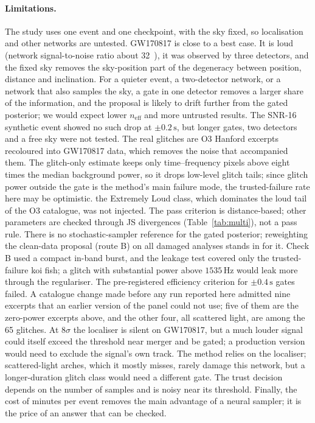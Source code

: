 \documentclass{openjournal}
\newcommand{\neff}{n_{\mathrm{eff}}}
\begin{document}
\paragraph{Limitations.}\label{sec:limits}
The study uses one event and one checkpoint, with the sky fixed, so localisation and other networks are untested.
GW170817 is close to a best case.
It is loud (network signal-to-noise ratio about 32~\cite{Abbott2017gw170817}), it was observed by three detectors, and the fixed sky removes the sky-position part of the degeneracy between position, distance and inclination.
For a quieter event, a two-detector network, or a network that also samples the sky, a gate in one detector removes a larger share of the information, and the proposal is likely to drift further from the gated posterior; we would expect lower $\neff$ and more untrusted results. The SNR-16 synthetic event showed no such drop at $\pm0.2\,\mathrm{s}$, but longer gates, two detectors and a free sky were not tested.
The real glitches are O3 Hanford excerpts recoloured into GW170817 data, which removes the noise that accompanied them. The glitch-only estimate keeps only time--frequency pixels above eight times the median background power, so it drops low-level glitch tails; since glitch power outside the gate is the method's main failure mode, the trusted-failure rate here may be optimistic. the Extremely Loud class, which dominates the loud tail of the O3 catalogue, was not injected.
The pass criterion is distance-based; other parameters are checked through JS divergences (Table~\ref{tab:multi}), not a pass rule.
There is no stochastic-sampler reference for the gated posterior; reweighting the clean-data proposal (route B) on all damaged analyses stands in for it.
Check B used a compact in-band burst, and the leakage test covered only the trusted-failure koi fish; a glitch with substantial power above $1535\,\mathrm{Hz}$ would leak more through the regulariser.
The pre-registered efficiency criterion for $\pm0.4\,\mathrm{s}$ gates failed.
A catalogue change made before any run reported here admitted nine excerpts that an earlier version of the panel could not use; five of them are the zero-power excerpts above, and the other four, all scattered light, are among the 65 glitches.
At $8\sigma$ the localiser is silent on GW170817, but a much louder signal could itself exceed the threshold near merger and be gated; a production version would need to exclude the signal's own track.
The method relies on the localiser; scattered-light arches, which it mostly misses, rarely damage this network, but a longer-duration glitch class would need a different gate.
The trust decision depends on the number of samples and is noisy near its threshold.
Finally, the cost of minutes per event removes the main advantage of a neural sampler; it is the price of an answer that can be checked.
\end{document}
